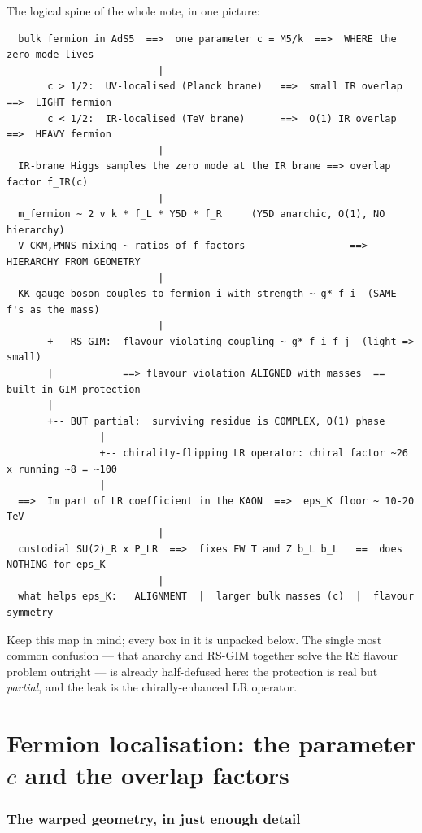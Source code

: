 \documentclass[11pt]{article}
\theoremstyle{definition}
\begin{document}
\noindent The logical spine of the whole note, in one picture:
\begin{footnotesize}
\begin{verbatim}
  bulk fermion in AdS5  ==>  one parameter c = M5/k  ==>  WHERE the zero mode lives
                          |
       c > 1/2:  UV-localised (Planck brane)   ==>  small IR overlap  ==>  LIGHT fermion
       c < 1/2:  IR-localised (TeV brane)      ==>  O(1) IR overlap   ==>  HEAVY fermion
                          |
  IR-brane Higgs samples the zero mode at the IR brane ==> overlap factor f_IR(c)
                          |
  m_fermion ~ 2 v k * f_L * Y5D * f_R     (Y5D anarchic, O(1), NO hierarchy)
  V_CKM,PMNS mixing ~ ratios of f-factors                  ==>  HIERARCHY FROM GEOMETRY
                          |
  KK gauge boson couples to fermion i with strength ~ g* f_i  (SAME f's as the mass)
                          |
       +-- RS-GIM:  flavour-violating coupling ~ g* f_i f_j  (light => small)
       |            ==> flavour violation ALIGNED with masses  ==  built-in GIM protection
       |
       +-- BUT partial:  surviving residue is COMPLEX, O(1) phase
                |
                +-- chirality-flipping LR operator: chiral factor ~26 x running ~8 = ~100
                |
  ==>  Im part of LR coefficient in the KAON  ==>  eps_K floor ~ 10-20 TeV
                          |
  custodial SU(2)_R x P_LR  ==>  fixes EW T and Z b_L b_L   ==  does NOTHING for eps_K
                          |
  what helps eps_K:   ALIGNMENT  |  larger bulk masses (c)  |  flavour symmetry
\end{verbatim}
\end{footnotesize}
\noindent Keep this map in mind; every box in it is unpacked below. The single
most common confusion --- that anarchy and RS-GIM together solve the RS flavour
problem outright --- is already half-defused here: the protection is real but
\emph{partial}, and the leak is the chirally-enhanced LR operator.

\part{Fermion localisation: the parameter $c$ and the overlap factors}
\label{part:loc}

\section{The warped geometry, in just enough detail}
\label{sec:geom}
\end{document}
